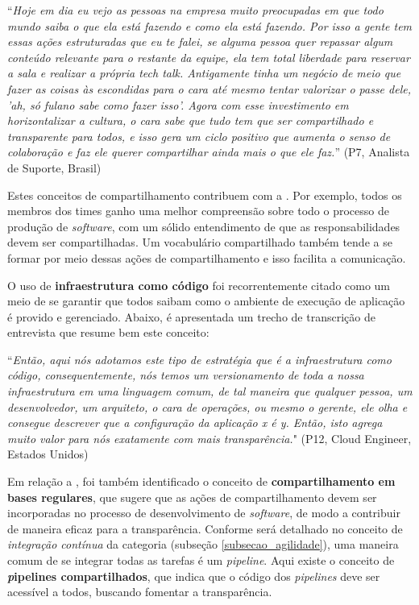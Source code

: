 \begin{mq}
``\emph{Hoje em dia eu vejo as pessoas na empresa muito preocupadas em que todo
mundo saiba o que ela está fazendo e como ela está fazendo. Por isso a gente
tem essas ações estruturadas que eu te falei, se alguma pessoa quer repassar
algum conteúdo relevante para o restante da equipe, ela tem total liberdade para
reservar a sala e realizar a própria tech talk. Antigamente tinha um negócio de
meio que fazer as coisas às escondidas para o cara até mesmo tentar valorizar
o passe dele, 'ah, só fulano sabe como fazer isso'. Agora com esse investimento
em horizontalizar a cultura, o cara sabe que tudo tem que ser compartilhado e
transparente para todos, e isso gera um ciclo positivo que aumenta o senso
de colaboração e faz ele querer compartilhar ainda mais o que ele faz.}''
(P7, Analista de Suporte, Brasil)
\end{mq}

Estes conceitos de compartilhamento contribuem com a \cc. Por exemplo, todos os
membros dos times ganho uma melhor compreensão sobre todo o processo de produção
de {\it software}, com um sólido entendimento de que as responsabilidades devem
ser compartilhadas. Um vocabulário compartilhado também tende a se formar por
meio dessas ações de compartilhamento e isso facilita a comunicação.

O uso de {\bf infraestrutura como código} foi recorrentemente citado como um
meio de se garantir que todos saibam como o ambiente de execução de aplicação
é provido e gerenciado. Abaixo, é apresentada um trecho de transcrição de
entrevista que resume bem este conceito:

\begin{mq}
``\emph{Então, aqui nós adotamos este tipo de estratégia
que é a infraestrutura como código, consequentemente, nós temos um versionamento
de toda a nossa infraestrutura em uma linguagem comum, de tal maneira que
qualquer pessoa, um desenvolvedor, um arquiteto, o cara de operações, ou mesmo
o gerente, ele olha e consegue descrever que a configuração da aplicação x é
y. Então, isto agrega muito valor para nós exatamente com mais transparência.}" (P12, Cloud Engineer, Estados Unidos)
\end{mq}

Em relação a , foi também identificado o
conceito de \textbf{compartilhamento em bases regulares}, que sugere que as
ações de compartilhamento devem ser incorporadas no processo de
desenvolvimento de {\it software}, de modo a contribuir de maneira eficaz
para a transparência. Conforme será detalhado no conceito de \emph{integração
contínua} da categoria  (subseção \ref{subsecao_agilidade}), uma
maneira comum de se integrar todas as tarefas é um {\it pipeline}. Aqui existe
o conceito de \textbf{{\emph pipelines} compartilhados}, que indica que o
código dos {\it pipelines} deve ser acessível a todos, buscando fomentar a
transparência.

